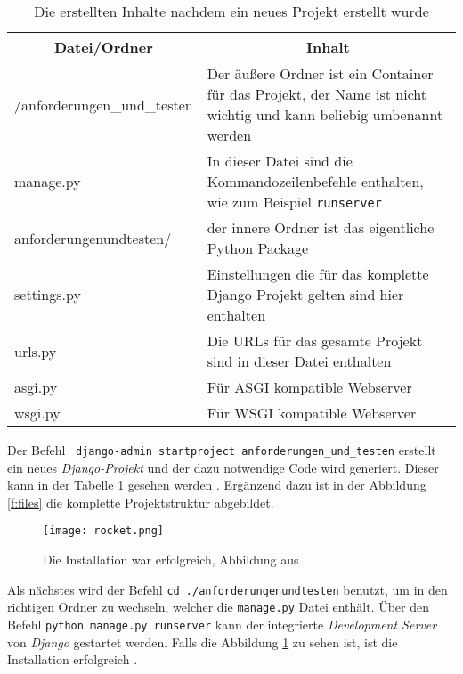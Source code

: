 \documentclass[11pt,a4paper]{report}
\begin{document}
\begin{table}
\centering
\begin{tabular}{|p{}|p{}|}
\hline
\multicolumn{1}{|c|}{\textbf{Datei/Ordner}} & 
\multicolumn{1}{|c|}{\textbf{Inhalt}} \\\hline
/anforderungen\_und\_testen & Der äußere Ordner ist ein Container für das Projekt, der Name ist nicht wichtig und kann beliebig umbenannt werden\\\hline
manage.py     & In dieser Datei sind die Kommandozeilenbefehle enthalten, wie zum Beispiel \verb|runserver| \\\hline
anforderungenundtesten/    & der innere Ordner ist das eigentliche Python Package \\\hline   

settings.py & Einstellungen die für das komplette Django Projekt gelten sind hier enthalten  \\\hline

urls.py & Die URLs für das gesamte Projekt sind in dieser Datei enthalten \\\hline
asgi.py & Für ASGI kompatible Webserver  \\\hline
wsgi.py & Für WSGI kompatible Webserver \\\hline

\end{tabular}
\caption{Die erstellten Inhalte nachdem ein neues Projekt erstellt wurde}
\label{tab:AutoCode}
\end{table}


Der Befehl ~\verb|django-admin startproject anforderungen_und_testen| erstellt ein neues \textit{Django-Projekt} und der dazu notwendige Code wird generiert. Dieser kann in der Tabelle \ref{tab:AutoCode} gesehen werden \cite{djangotuto3}. Ergänzend dazu ist in der Abbildung \ref{f:files} die komplette Projektstruktur abgebildet. 



\begin{figure}[htpb]
  \centering
  \texttt{[image: rocket.png]}
  \caption{Die Installation war erfolgreich, Abbildung aus \cite{mozillatuto2}}
  \label{f:rocket}
\end{figure}


Als nächstes wird der Befehl \verb|cd ./anforderungenundtesten| benutzt, um in den richtigen Ordner zu wechseln, welcher die \verb|manage.py| Datei enthält. Über den Befehl \verb|python manage.py runserver| kann der integrierte \textit{Development Server} von \textit{Django} gestartet werden. Falls die Abbildung \ref{f:rocket} zu sehen ist, ist die Installation erfolgreich \cite{djangotuto3}.
\end{document}
